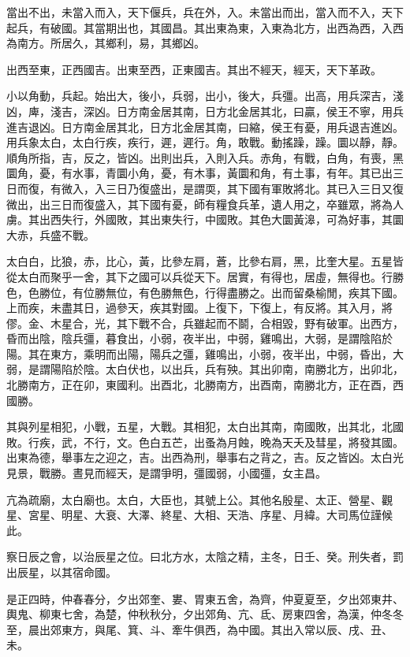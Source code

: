 當出不出，未當入而入，天下偃兵，兵在外，入。未當出而出，當入而不入，天下起兵，有破國。其當期出也，其國昌。其出東為東，入東為北方，出西為西，入西為南方。所居久，其鄉利，易，其鄉凶。

出西至東，正西國吉。出東至西，正東國吉。其出不經天，經天，天下革政。

小以角動，兵起。始出大，後小，兵弱，出小，後大，兵彊。出高，用兵深吉，淺凶，庳，淺吉，深凶。日方南金居其南，日方北金居其北，曰贏，侯王不寧，用兵進吉退凶。日方南金居其北，日方北金居其南，曰縮，侯王有憂，用兵退吉進凶。用兵象太白，太白行疾，疾行，遲，遲行。角，敢戰。動搖躁，躁。圜以靜，靜。順角所指，吉，反之，皆凶。出則出兵，入則入兵。赤角，有戰，白角，有喪，黑圜角，憂，有水事，青圜小角，憂，有木事，黃圜和角，有土事，有年。其已出三日而復，有微入，入三日乃復盛出，是謂耎，其下國有軍敗將北。其已入三日又復微出，出三日而復盛入，其下國有憂，師有糧食兵革，遺人用之，卒雖眾，將為人虜。其出西失行，外國敗，其出東失行，中國敗。其色大圜黃滜，可為好事，其圜大赤，兵盛不戰。

太白白，比狼，赤，比心，黃，比參左肩，蒼，比參右肩，黑，比奎大星。五星皆從太白而聚乎一舍，其下之國可以兵從天下。居實，有得也，居虛，無得也。行勝色，色勝位，有位勝無位，有色勝無色，行得盡勝之。出而留桑榆閒，疾其下國。上而疾，未盡其日，過參天，疾其對國。上復下，下復上，有反將。其入月，將僇。金、木星合，光，其下戰不合，兵雖起而不鬬，合相毀，野有破軍。出西方，昏而出陰，陰兵彊，暮食出，小弱，夜半出，中弱，雞鳴出，大弱，是謂陰陷於陽。其在東方，乘明而出陽，陽兵之彊，雞鳴出，小弱，夜半出，中弱，昏出，大弱，是謂陽陷於陰。太白伏也，以出兵，兵有殃。其出卯南，南勝北方，出卯北，北勝南方，正在卯，東國利。出酉北，北勝南方，出酉南，南勝北方，正在酉，西國勝。

其與列星相犯，小戰，五星，大戰。其相犯，太白出其南，南國敗，出其北，北國敗。行疾，武，不行，文。色白五芒，出蚤為月蝕，晚為天夭及彗星，將發其國。出東為德，舉事左之迎之，吉。出西為刑，舉事右之背之，吉。反之皆凶。太白光見景，戰勝。晝見而經天，是謂爭明，彊國弱，小國彊，女主昌。

亢為疏廟，太白廟也。太白，大臣也，其號上公。其他名殷星、太正、營星、觀星、宮星、明星、大衰、大澤、終星、大相、天浩、序星、月緯。大司馬位謹候此。

察日辰之會，以治辰星之位。曰北方水，太陰之精，主冬，日壬、癸。刑失者，罰出辰星，以其宿命國。

是正四時，仲春春分，夕出郊奎、婁、胃東五舍，為齊，仲夏夏至，夕出郊東井、輿鬼、柳東七舍，為楚，仲秋秋分，夕出郊角、亢、氐、房東四舍，為漢，仲冬冬至，晨出郊東方，與尾、箕、斗、牽牛俱西，為中國。其出入常以辰、戌、丑、未。

